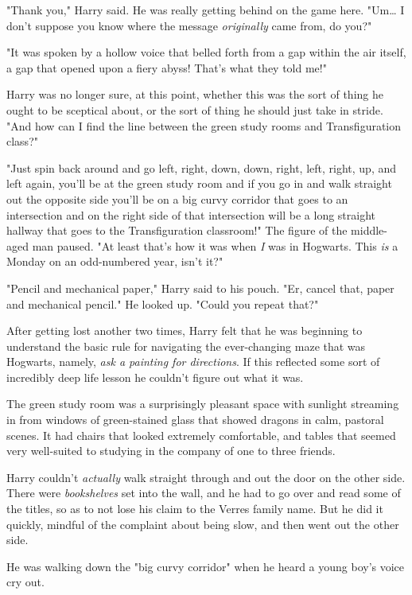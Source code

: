 "Thank you," Harry said. He was really getting behind on the game here. 
"Um{\ldots} I don't suppose you know where the message \emph{originally} came 
from, do you?"

"It was spoken by a hollow voice that belled forth from a gap within the air 
itself, a gap that opened upon a fiery abyss! That's what they told me!"

Harry was no longer sure, at this point, whether this was the sort of thing he 
ought to be sceptical about, or the sort of thing he should just take in 
stride. "And how can I find the line between the green study rooms and 
Transfiguration class?"

"Just spin back around and go left, right, down, down, right, left, right, up, 
and left again, you'll be at the green study room and if you go in and walk 
straight out the opposite side you'll be on a big curvy corridor that goes to 
an intersection and on the right side of that intersection will be a long 
straight hallway that goes to the Transfiguration classroom!" The figure of the 
middle-aged man paused. "At least that's how it was when \emph{I} was in 
Hogwarts. This \emph{is} a Monday on an odd-numbered year, isn't it?"

"Pencil and mechanical paper," Harry said to his pouch. "Er, cancel that, paper 
and mechanical pencil." He looked up. "Could you repeat that?"

After getting lost another two times, Harry felt that he was beginning to 
understand the basic rule for navigating the ever-changing maze that was 
Hogwarts, namely, \emph{ask a painting for directions}. If this reflected some 
sort of incredibly deep life lesson he couldn't figure out what it was.

The green study room was a surprisingly pleasant space with sunlight streaming 
in from windows of green-stained glass that showed dragons in calm, pastoral 
scenes. It had chairs that looked extremely comfortable, and tables that seemed 
very well-suited to studying in the company of one to three friends.

Harry couldn't \emph{actually} walk straight through and out the door on the 
other side. There were \emph{bookshelves} set into the wall, and he had to go 
over and read some of the titles, so as to not lose his claim to the Verres 
family name. But he did it quickly, mindful of the complaint about being slow, 
and then went out the other side.

He was walking down the "big curvy corridor" when he heard a young boy's voice 
cry out.

